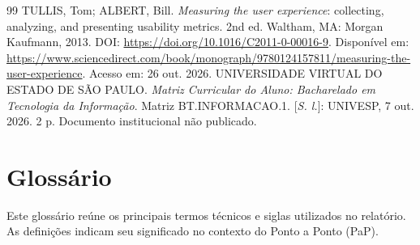 \documentclass[12pt,oneside,a4paper,brazil,chapter=TITLE]{abntex2}
\begin{document}
\begin{thebibliography}{99}
 TULLIS, Tom; ALBERT, Bill. \textit{Measuring the user experience}: collecting, analyzing, and presenting usability metrics. 2nd ed. Waltham, MA: Morgan Kaufmann, 2013. DOI: \url{https://doi.org/10.1016/C2011-0-00016-9}. Disponível em: \url{https://www.sciencedirect.com/book/monograph/9780124157811/measuring-the-user-experience}. Acesso em: 26 out. 2026.
 UNIVERSIDADE VIRTUAL DO ESTADO DE SÃO PAULO. \textit{Matriz Curricular do Aluno: Bacharelado em Tecnologia da Informação}. Matriz BT.INFORMACAO.1. [\textit{S. l.}]: UNIVESP, 7 out. 2026. 2 p. Documento institucional não publicado.
\end{thebibliography}


\chapter*{Glossário}
\label{sec:glossario}
Este glossário reúne os principais termos técnicos e siglas utilizados no relatório. As definições indicam seu significado no contexto do Ponto a Ponto (PaP).
\end{document}
